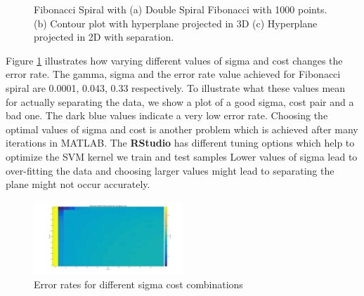 \documentclass[conference]{IEEEtran}
\begin{document}
\begin{figure}[h!]
  \centering
  	\caption{Fibonacci Spiral with
		(a) Double Spiral Fibonacci with 1000 points. 
	    (b) Contour plot with hyperplane projected in 3D
	    (c) Hyperplane projected in 2D with separation.  
    }
		\end{figure}
		
Figure \ref{fig:perf} illustrates how varying different values of
sigma and cost changes the error rate. The gamma, sigma and the error rate value achieved for Fibonacci spiral are 0.0001, 0.043, 0.33 respectively. To illustrate what these values mean for actually separating the data, we show a plot of a good sigma, cost pair and a bad one. The dark blue values indicate a very low error rate. Choosing the optimal values of sigma and cost is another problem which is achieved after many iterations in MATLAB. The \textbf{RStudio} has different tuning options which help to optimize the SVM kernel we train and test samples
Lower values of sigma lead to over-fitting the data and choosing larger values might lead to separating the plane might not occur accurately.

\begin{figure}[bt!]
\centering
\includegraphics[width=0.5\textwidth]{figs/perf.png}
\caption{Error rates for different sigma cost combinations}
\label{fig:perf} 
\end{figure}
\end{document}
